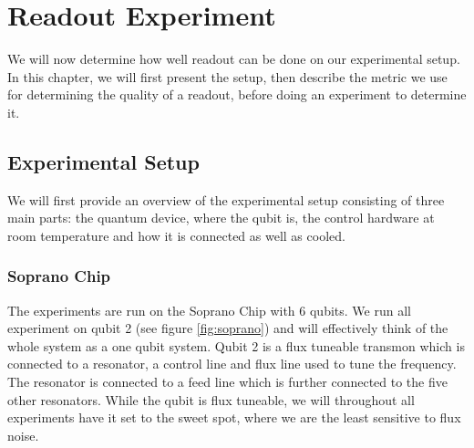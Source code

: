 \chapter{Readout Experiment}\label{chap:readout}
We will now determine how well readout can be done on our experimental setup. In this chapter, we will first present the setup, then describe the metric we use for determining the quality of a readout, before doing an experiment to determine it.

\section{Experimental Setup}
We will first provide an overview of the experimental setup consisting of three main parts: the quantum device, where the qubit is, the control hardware at room temperature and how it is connected as well as cooled.


\subsection{Soprano Chip}
The experiments are run on the Soprano Chip with 6 qubits. We run all experiment on qubit 2 (see figure \ref{fig:soprano}) and will effectively think of the whole system as a one qubit system. Qubit 2 is a flux tuneable transmon which is connected to a resonator, a control line and flux line used to tune the frequency. The resonator is connected to a feed line which is further connected to the five other resonators. While the qubit is flux tuneable, we will throughout all experiments have it set to the sweet spot,  where we are the least sensitive to flux noise. 

